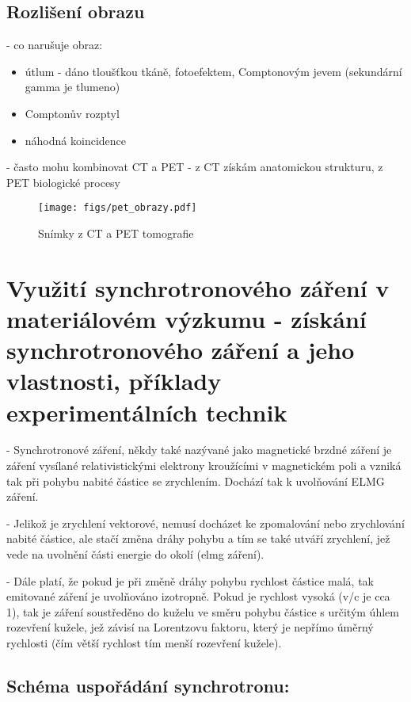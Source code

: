 \subsection{Rozlišení obrazu}
- co narušuje obraz:
\begin{itemize}
    \item útlum - dáno tloušťkou tkáně, fotoefektem, Comptonovým jevem (sekundární gamma je tlumeno)
    \item Comptonův rozptyl
    \item náhodná koincidence
\end{itemize}

- často mohu kombinovat CT a PET
- z CT získám anatomickou strukturu, z PET biologické procesy


\begin{figure}[ht!]
    \centering
    \texttt{[image: figs/pet\_obrazy.pdf]}
    \caption{Snímky z CT a PET tomografie}
    \label{fig:2_6_CT_PET_tomografie}
\end{figure}

\newpage
\section{Využití synchrotronového záření v materiálovém výzkumu - získání synchrotronového záření a jeho vlastnosti,
příklady experimentálních technik}

- Synchrotronové záření, někdy také nazývané jako magnetické brzdné záření je záření vysílané relativistickými elektrony kroužícími v magnetickém poli a vzniká tak při pohybu nabité částice se zrychlením. Dochází tak k uvolňování ELMG záření.

- Jelikož je zrychlení vektorové, nemusí docházet ke zpomalování nebo zrychlování nabité částice, ale stačí změna dráhy pohybu a tím se také utváří zrychlení, jež vede na uvolnění části energie do okolí (elmg záření).

- Dále platí, že pokud je při změně dráhy pohybu rychlost částice malá, tak emitované záření je uvolňováno izotropně. Pokud je rychlost vysoká (v/c je cca 1), tak je záření soustředěno do kuželu ve směru pohybu částice s určitým úhlem rozevření kužele, jež závisí na Lorentzovu faktoru, který je nepřímo úměrný rychlosti (čím větší rychlost tím menší rozevření kužele).

\subsection{Schéma uspořádání synchrotronu:}


